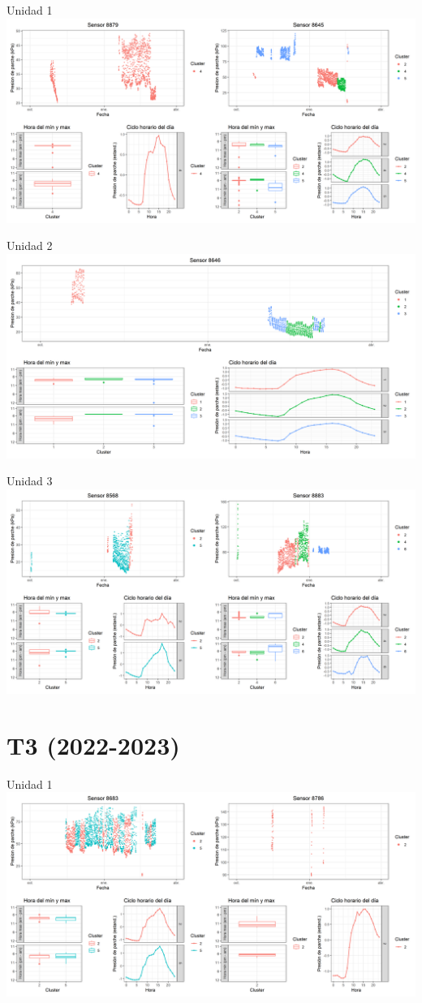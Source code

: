 \documentclass[
  letterpaper,
  DIV=11,
  numbers=noendperiod]{scrreprt}
\begin{document}
Unidad 1
\includegraphics{figuras/02_turgor_limpiado/2022_2023_Rio_Claro_T2_Unidad_1.png}

Unidad 2
\includegraphics{figuras/02_turgor_limpiado/2022_2023_Rio_Claro_T2_Unidad_2.png}

Unidad 3
\includegraphics{figuras/02_turgor_limpiado/2022_2023_Rio_Claro_T2_Unidad_3.png}

\chapter{T3 (2022-2023)}

Unidad 1
\includegraphics{figuras/02_turgor_limpiado/2022_2023_Rio_Claro_T3_Unidad_1.png}
\end{document}
